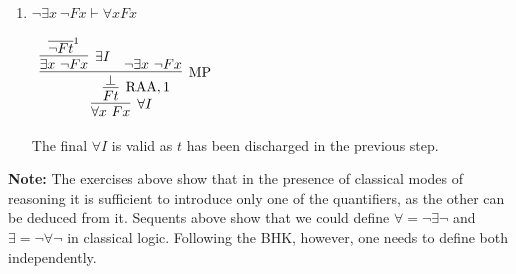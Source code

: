 \documentclass[11pt]{report}
\newcommand{\temp}[2]{{\overline{#2}}^{#1}}
\begin{document}
\begin{enumerate}
\begin{enumerate}
			\begin{center}
				$\begin{array}{c}
					\infer[\RAA,2]{\exists x \ Fx}
						{\infer[\MP]{\bot}
							{\infer[\forall I]{\forall x \lnot Fx}
								{\infer[\to I,1]{\lnot Ft}
									{\infer[\MP]{\bot}
										{\infer[\exists I]{\exists x \ Fx}
											{\temp{1}{Ft}}
										&
										\temp{2}{\lnot \exists x \ Fx}}}}
							&
							\lnot \forall x \ \lnot Fx}}
				\end{array}$
			\end{center}
			
			\item $ \lnot \exists x \ \lnot Fx \vdash \forall x Fx$
			
			\begin{center}
				$\begin{array}{c}
					\infer[\forall I]{\forall x \ Fx}
						{\infer[\RAA,1]{Ft}
							{\infer[\MP]{\bot}
								{\infer[\exists I]{\exists x \ \lnot Fx}
									{\temp{1}{\lnot Ft}}
								&
								\lnot \exists x \ \lnot Fx}}}
				\end{array}$
			\end{center}

			The final $\forall I$ is valid as $t$ has been discharged in the previous step.

		\end{enumerate}
\end{enumerate}
	
\textbf{Note:} The exercises above show that in the presence of classical modes of reasoning it is sufficient to introduce only one of the quantifiers, as the other can be deduced from it. Sequents above show that we could define $\forall = \lnot \exists \lnot$ and $\exists = \lnot \forall \lnot$ in classical logic. Following the BHK, however, one needs to define both independently. 
\end{document}
